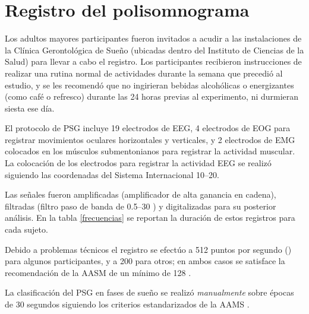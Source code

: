 
\section{Registro del polisomnograma}

Los adultos mayores participantes fueron invitados a acudir a las instalaciones de la Clínica 
Gerontológica de Sueño (ubicadas dentro del Instituto de Ciencias de la Salud) para llevar a cabo 
el registro. Los participantes recibieron instrucciones de realizar una rutina normal de 
actividades durante la semana que precedió al estudio, y se les recomendó que no ingirieran bebidas 
alcohólicas o energizantes (como café o refresco) durante las 24 horas previas al experimento, ni 
durmieran siesta ese día.

El protocolo de PSG incluye 19 electrodos de EEG, 4 electrodos de EOG para registrar movimientos 
oculares horizontales y verticales, y 2 electrodos de EMG colocados en los músculos submentonianos 
para registrar la actividad muscular. 
La colocación de los electrodos para registrar la actividad EEG se realizó siguiendo las 
coordenadas del Sistema Internacional 10--20.

Las señales fueron amplificadas (amplificador de alta ganancia en cadena), filtradas (filtro paso 
de banda de 0.5--30 \hz) y digitalizadas para su posterior análisis.
En la tabla \ref{frecuencias} se reportan la duración de estos registros para cada sujeto.

Debido a problemas técnicos el registro se efectúo a 512 puntos por segundo (\hz) para algunos
participantes, y a 200 \hz para otros; en ambos casos se satisface la recomendación de la AASM de un 
mínimo de 128 \hz. 

La clasificación del PSG en fases de sueño se realizó \textit{manualmente} sobre épocas de 30 
segundos siguiendo los criterios estandarizados de la AAMS \cite{Hori01}.


